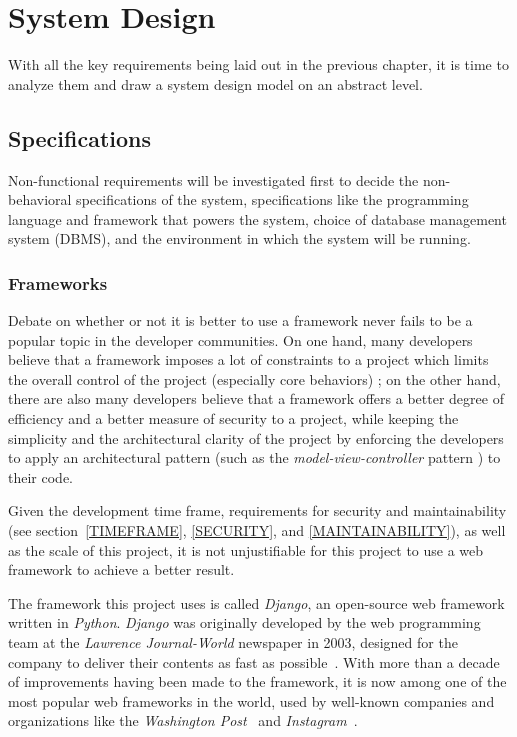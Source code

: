 

\chapter{System Design}
\label{chap:SYSDES}

With all the key requirements being laid out in the previous chapter, it is
time to analyze them and draw a system design model on an abstract
level. 

\section{Specifications}
Non-functional requirements will be investigated first to decide the
non-behavioral specifications of the system, specifications like the
programming language and framework that powers the system, choice of database
management system (DBMS),
and the environment in which the system will be running.

\subsection{Frameworks}
Debate on whether or not it is better to use a framework never fails to be
a popular topic in the developer communities. On one hand, many developers
believe that a framework imposes a lot of constraints to a project which limits the
overall control of the project (especially core behaviors) \cite{frameworks};
on the other hand, there are also many developers believe that a framework
offers a better degree of efficiency and a better
measure of security to a project, while keeping the simplicity and
the architectural clarity of the project by enforcing the developers to apply
an architectural pattern (such as the \emph{model-view-controller} pattern
\cite{mvc}) to their code.

\medskip

Given the development time frame, requirements for
security and maintainability (see section~\ref{TIMEFRAME},
\ref{SECURITY}, and \ref{MAINTAINABILITY}),
as well as the scale of this project,
it is not unjustifiable for this project to use a web framework to achieve a
better result.

\medskip

The framework this project uses is called \emph{Django}, an open-source web
framework written in \emph{Python}. \emph{Django} was originally developed by
the web programming team at the \emph{Lawrence Journal-World} newspaper in 2003,
designed for the company to deliver their contents as fast as possible~\cite{django}.
With more than a decade of improvements
having been made to the framework, it is now among one of the most popular web
frameworks in the world, used by well-known companies and organizations like the
\emph{Washington Post}~\cite{djangoWashingtonPost}
and \emph{Instagram}~\cite{djangoInstagram}.
\medskip

